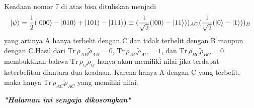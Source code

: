 \par
Keadaan nomor 7 di atas bisa dituliskan menjadi
\begin{equation}
	\ket{\psi}=\frac{1}{2}(\ket{000}-\ket{010}+\ket{101}-\ket{111})\equiv(\frac{1}{\sqrt{2}}(\ket{00}-\ket{11}))_{AC}(\frac{1}{\sqrt{2}}(\ket{0}-\ket{1}))_{B}
\end{equation}
yang artinya A hanya terbelit dengan C dan tidak terbelit dengan B maupun dengan C.Hasil dari $\mathrm{Tr}\,\rho_{AB}\tilde{\rho}_{AB}=0$, $\mathrm{Tr}\,\rho_{AC}\tilde{\rho}_{AC}=1$, dan $\mathrm{Tr}\,\rho_{BC}\tilde{\rho}_{BC}=0$ membuktikan bahwa $\mathrm{Tr}\,\rho_{ij}\tilde{\rho}_{ij}$ hanya akan memiliki nilai jika terdapat keterbelitan diantara dua keadaan. Karena hanya A dengan C yang terbelit, maka hanya $\mathrm{Tr}\,\rho_{AC}\tilde{\rho}_{AC}$ yang memiliki nilai.


\newpage
\thispagestyle{empty}
\begin{center}
	\vspace*{\fill}
	\textit{\textbf{"Halaman ini sengaja dikosongkan"}}
	\vspace*{\fill}
\end{center}
\pagebreak